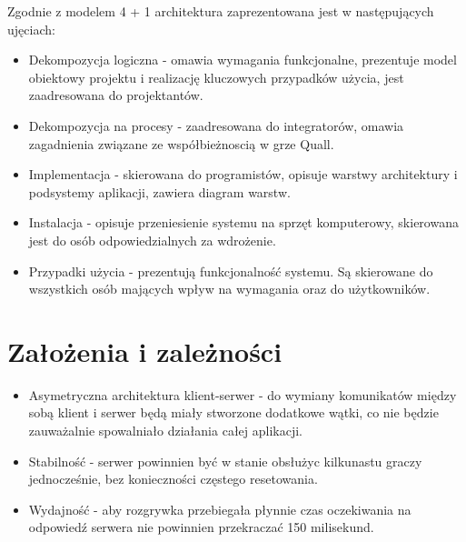\documentclass[12pt,a4paper,twoside]{article}
\begin{document}
Zgodnie z modelem 4 + 1 architektura zaprezentowana jest w następujących ujęciach:

\begin{itemize}
\item Dekompozycja logiczna - omawia wymagania funkcjonalne, prezentuje model obiektowy projektu i realizację kluczowych przypadków użycia, jest zaadresowana do projektantów.
\item Dekompozycja na procesy - zaadresowana do integratorów, omawia zagadnienia związane ze współbieżnoscią w grze Quall. 
\item Implementacja - skierowana do programistów, opisuje warstwy architektury i podsystemy aplikacji, zawiera diagram warstw.
\item Instalacja - opisuje przeniesienie systemu na sprzęt komputerowy, skierowana jest do osób odpowiedzialnych za wdrożenie.
\item Przypadki użycia - prezentują funkcjonalność systemu. Są skierowane do wszystkich osób mających wpływ na wymagania oraz do użytkowników.
\end{itemize}

\section{Założenia i zależności}


\begin{itemize}
\item Asymetryczna architektura klient-serwer - do wymiany komunikatów między sobą klient i serwer będą miały stworzone dodatkowe wątki, co nie będzie zauważalnie spowalniało działania całej aplikacji.
\item Stabilność - serwer powinnien być w stanie obsłużyc kilkunastu graczy jednocześnie, bez konieczności częstego resetowania.
\item Wydajność - aby rozgrywka przebiegała płynnie czas oczekiwania na odpowiedź serwera nie powinnien przekraczać 150 milisekund.
\end{itemize}
\end{document}
